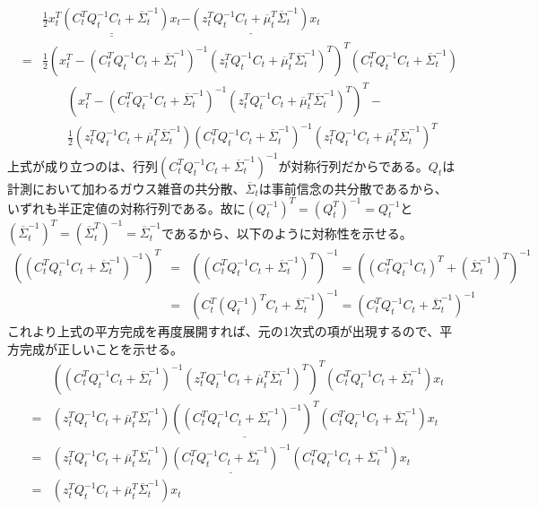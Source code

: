 \documentclass[dvipdfmx,a4paper]{jsarticle}
\begin{document}
\begin{eqnarray}
	&& \underline{\underline{\frac{1}{2} x_t^T \left( C_t^T Q_t^{-1} C_t + \overline{\Sigma}_t^{-1} \right) x_t}} \underline{-\left( z_t^T Q_t^{-1} C_t + \overline{\mu}_t^T \overline{\Sigma}_t^{-1} \right) x_t} \nonumber \\
	&=& \frac{1}{2} \left( x_t^T - \left( C_t^T Q_t^{-1} C_t + \overline{\Sigma}_t^{-1} \right)^{-1} \left( z_t^T Q_t^{-1} C_t + \overline{\mu}_t^T \overline{\Sigma}_t^{-1} \right)^T \right)^T \left( C_t^T Q_t^{-1} C_t + \overline{\Sigma}_t^{-1} \right) \nonumber \\
	&& \qquad \left( x_t^T - \left( C_t^T Q_t^{-1} C_t + \overline{\Sigma}_t^{-1} \right)^{-1} \left( z_t^T Q_t^{-1} C_t + \overline{\mu}_t^T \overline{\Sigma}_t^{-1} \right)^T \right)^T - \nonumber \\
	&& \qquad \frac{1}{2} \left( z_t^T Q_t^{-1} C_t + \overline{\mu}_t^T \overline{\Sigma}_t^{-1} \right) \left( C_t^T Q_t^{-1} C_t + \overline{\Sigma}_t^{-1} \right)^{-1} \left( z_t^T Q_t^{-1} C_t + \overline{\mu}_t^T \overline{\Sigma}_t^{-1} \right)^T
\end{eqnarray}
上式が成り立つのは、行列$\left( C_t^T Q_t^{-1} C_t + \overline{\Sigma}_t^{-1} \right)^{-1}$が対称行列だからである。$Q_t$は計測において加わるガウス雑音の共分散、$\overline{\Sigma}_t$は事前信念の共分散であるから、いずれも半正定値の対称行列である。故に$\left( Q_t^{-1} \right)^T = \left( Q_t^T \right)^{-1} = Q_t^{-1}$と$\left( \overline{\Sigma}_t^{-1} \right)^T = \left( \overline{\Sigma}_t^T \right)^{-1} = \overline{\Sigma}_t^{-1}$であるから、以下のように対称性を示せる。
\begin{eqnarray}
	\left( \left( C_t^T Q_t^{-1} C_t + \overline{\Sigma}_t^{-1} \right)^{-1} \right)^T &=& \left( \left( C_t^T Q_t^{-1} C_t + \overline{\Sigma}_t^{-1} \right)^T \right)^{-1} = \left( \left( C_t^T Q_t^{-1} C_t \right)^T + \left( \overline{\Sigma}_t^{-1} \right)^T \right)^{-1} \nonumber \\
	&=& \left( C_t^T \left( Q_t^{-1} \right)^T C_t + \overline{\Sigma}_t^{-1} \right)^{-1} = \left( C_t^T Q_t^{-1} C_t + \overline{\Sigma}_t^{-1} \right)^{-1}
\end{eqnarray}
これより上式の平方完成を再度展開すれば、元の1次式の項が出現するので、平方完成が正しいことを示せる。
\begin{eqnarray}
	&& \left( \left( C_t^T Q_t^{-1} C_t + \overline{\Sigma}_t^{-1} \right)^{-1} \left( z_t^T Q_t^{-1} C_t + \overline{\mu}_t^T \overline{\Sigma}_t^{-1} \right)^T \right)^T \left( C_t^T Q_t^{-1} C_t + \overline{\Sigma}_t^{-1} \right) x_t \nonumber \\
	&=& \left( z_t^T Q_t^{-1} C_t + \overline{\mu}_t^T \overline{\Sigma}_t^{-1} \right) \underline{\left( \left( C_t^T Q_t^{-1} C_t + \overline{\Sigma}_t^{-1} \right)^{-1} \right)^T} \left( C_t^T Q_t^{-1} C_t + \overline{\Sigma}_t^{-1} \right) x_t \nonumber \\
	&=& \left( z_t^T Q_t^{-1} C_t + \overline{\mu}_t^T \overline{\Sigma}_t^{-1} \right) \underline{\left( C_t^T Q_t^{-1} C_t + \overline{\Sigma}_t^{-1} \right)^{-1}} \left( C_t^T Q_t^{-1} C_t + \overline{\Sigma}_t^{-1} \right) x_t \nonumber \\
	&=& \left( z_t^T Q_t^{-1} C_t + \overline{\mu}_t^T \overline{\Sigma}_t^{-1} \right) x_t
\end{eqnarray}
\end{document}
